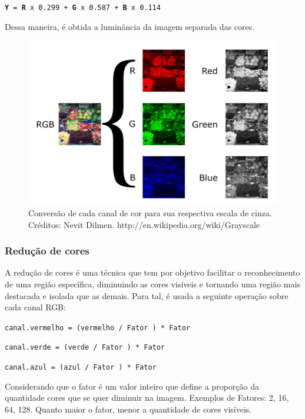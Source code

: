 \documentclass[12pt]{article}
\begin{document}
\texttt{\small \textbf{Y} = \textbf{R} x 0.299 + \textbf{G} x 0.587 + \textbf{B} x 0.114}

\noindent Dessa maneira, \'e obtida a lumin\^ancia da imagem separada das cores.

	\begin{figure}[ht!]
	\begin{center}
		\includegraphics[scale=0.8]{img/1200px-Beyoglu_4671_tricolor.png}
		\footnotesize \caption{Convers\~ao de cada canal de cor para sua respectiva escala de cinza. Cr\'editos: Nevit Dilmen. http://en.wikipedia.org/wiki/Grayscale }
	\end{center}
	\end{figure}	

\subsubsection{Redu\c c\~ao de cores}
A redu\c c\~ao de cores \'e uma t\'ecnica que tem por objetivo facilitar o reconhecimento de uma regi\~ao espec\'ifica,
diminuindo as cores vis\'iveis e tornando uma regi\~ao mais destacada e isolada que as demais.
Para tal, \'e usada a seguinte opera\c c\~ao sobre cada canal RGB:

\texttt{\small canal.vermelho = (vermelho / Fator ) * Fator}

\texttt{\small canal.verde = (verde / Fator ) * Fator}

\texttt{\small canal.azul = (azul / Fator ) * Fator}
\vspace{0.5cm}

\noindent Considerando que o fator \'e um valor inteiro que define a propor\c c\~ao da quantidade cores que se quer diminuir na imagem.
Exemplos de Fatores: 2, 16, 64, 128. Quanto maior o fator, menor a quantidade de cores vis\'iveis.
\end{document}
